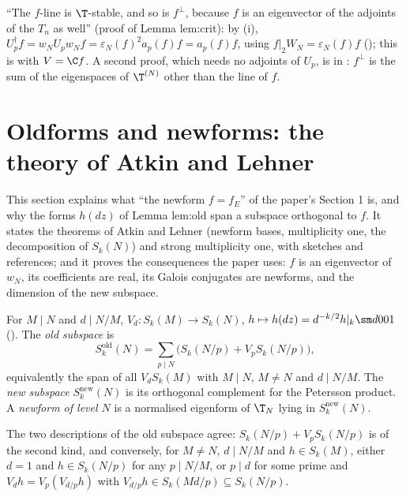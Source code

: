 \begin{paperlink}\label{pl:hecke:adjoints}
``The $f$-line is $\T$-stable, and so is $f^\perp$, because $f$ is an eigenvector of the adjoints of the $T_n$ as well'' (proof of Lemma lem:crit): by (i),
$U_p^\dagger f=w_NU_pw_Nf=\varepsilon_N(f)^2a_p(f)f=a_p(f)f$, using $f|_2W_N=\varepsilon_N(f)f$ (); this is  with $V=\C f$. A second proof,
which needs no adjoints of $U_p$, is in : $f^\perp$ is the sum of the eigenspaces of $\T^{(N)}$ other than the line of $f$.
\end{paperlink}

\section{Oldforms and newforms: the theory of Atkin and Lehner}\label{sec:hecke:newforms}

This section explains what ``the newform $f=f_E$'' of the paper's Section 1 is, and why the forms $h(dz)$ of Lemma lem:old span a subspace orthogonal to $f$. It
states the theorems of Atkin and Lehner (newform bases, multiplicity one, the decomposition of $S_k(N)$) and strong multiplicity one, with sketches and references; and it
proves the consequences the paper uses: $f$ is an eigenvector of $w_N$, its coefficients are real, its Galois conjugates are newforms, and the dimension of the new
subspace.

\begin{definition}\label{def:hecke:old-new}
For $M\mid N$ and $d\mid N/M$, $V_d\colon S_k(M)\to S_k(N)$, $h\mapsto h(dz)=d^{-k/2}h|_k\sm d001$ (). The \emph{old subspace} is
\[
S_k^{\mathrm{old}}(N)=\sum_{p\mid N}\bigl(S_k(N/p)+V_pS_k(N/p)\bigr),
\]
equivalently the span of all $V_dS_k(M)$ with $M\mid N$, $M\ne N$ and $d\mid N/M$. The \emph{new subspace} $S_k^{\mathrm{new}}(N)$ is its orthogonal complement for the Petersson product. A
\emph{newform of level $N$} is a normalised eigenform of $\T_N$ lying in $S_k^{\mathrm{new}}(N)$.
\end{definition}

The two descriptions of the old subspace agree: $S_k(N/p)+V_pS_k(N/p)$ is of the second kind, and conversely, for $M\ne N$, $d\mid N/M$ and $h\in S_k(M)$, either $d=1$ and
$h\in S_k(N/p)$ for any $p\mid N/M$, or $p\mid d$ for some prime and $V_dh=V_p(V_{d/p}h)$ with $V_{d/p}h\in S_k(Md/p)\subseteq S_k(N/p)$.

